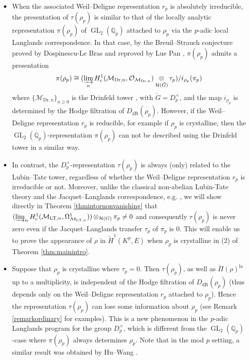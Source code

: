 \documentclass{article}
\theoremstyle{definition}
\def\calH{\mathcal{H}}
\def\calM{\mathcal{M}}
\def\calO{\mathcal{O}}
\def\bbQ{\mathbb{Q}}
\DeclareMathOperator{\ox}{\otimes}
\def\isom{\cong}
\newcommand{\dlim}{\varinjlim}
\DeclareMathOperator{\GL}{GL}
\DeclareMathOperator{\dR}{dR}
\def\LT{\mathrm{LT}}
\def\lan{\mathrm{la}}
\def\Dr{\mathrm{Dr}}
\begin{document}
\begin{itemize}
    \item When the associated Weil--Deligne representation $r_p$ is absolutely irreducible, the presentation of $\tau(\rho_p)$ is similar to that of the locally analytic representation $\pi(\rho_p)$ of $\GL_2(\bbQ_p)$ attached to $\rho_p$ via the $p$-adic local Langlands correspondence. In that case, by the Breuil--Strauch conjecture proved by Dospinescu-Le Bras \cite{DLB17} and reproved by Lue Pan \cite[Theorem 7.3.2]{PanII}, $\pi(\rho_p)$ admits a presentation
    \begin{align}\label{equationintrorepdrinfeld}
        \pi(\rho_p)\isom (\dlim_nH^1_c(\calM_{\Dr,n},\calO_{\calM_{\Dr,n}})\ox_{\calH(\check G)}\tau_p)/i_{\rho_p}(\pi_p)
    \end{align}
    where $\{\calM_{\Dr,n}\}_{n\ge 0}$ is the Drinfeld tower \cite{Dr76}, with $\check{G}=D_p^\times$, and the map $i_{\rho_p}$ is determined by the Hodge filtration of $D_{\dR}(\rho_p)$. However, if the Weil--Deligne representation $r_p$ is reducible, for example if $\rho_p$ is crystalline, then the $\GL_2(\bbQ_p)$-representation $\pi(\rho_p)$ can not be described using the Drinfeld tower in a similar way. 
    \item In contrast, the $D_p^\times$-representation $\tau(\rho_p)$ is always (only) related to the Lubin--Tate tower, regardless of whether the Weil--Deligne representation $r_p$ is irreducible or not. Moreover, unlike the classical non-abelian Lubin-Tate theory and the Jacquet--Langlands correspondence, e.g. \cite{Carayol1990_nonabelianLT,dat2007_LT_nonabelian}, we will show directly in Theorem \ref{thmintornonvanishing} that $(\dlim_n H^1_c(\calM_{\LT,n},\Omega_{\calM_{\LT,n}}^1))\ox_{\calH(G)}\pi_p\neq 0$ and consequently $\tau(\rho_p)$ is never zero even if the Jacquet--Langlands transfer $\tau_p$ of $\pi_p$ is $0$. This will enable us to prove the appearance of $\rho$ in $\widetilde{H}^1(K^p,E)$ when $\rho_p$ is crystalline in (2) of Theorem \ref{thm:mainintro}. 
    \item Suppose that $\rho_p$ is crystalline where $\tau_p=0$. Then $\tau(\rho_p)$, as well as $\check{\Pi}(\rho)^{\lan}$ up to a multiplicity, is independent of the Hodge filtration of $D_{\dR}(\rho_p)$ (thus depends only on the Weil--Deligne representation $r_p$ attached to $\rho_p$). Hence the representation $\tau(\rho_p)$ can lose some information about $\rho_p$ (see Remark \ref{remarkordinary} for examples). This is a new phenomenon in the $p$-adic Langlands program for the group $D_p^{\times}$, which is different from the $\GL_2(\bbQ_p)$-case where $\pi(\rho_p)$ always determines $\rho_p$. Note that in the mod $p$ setting, a similar result was obtained by Hu--Wang \cite[Theorem 1.3(ii)(a)]{HuWang}.
\end{itemize}
\end{document}
